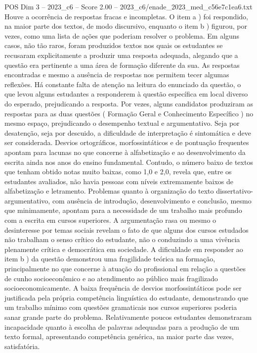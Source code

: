\begin{textsample}{POS Dim 3 – 2023\_c6 – Score 2.00 – 2023\_c6/enade\_2023\_med\_c56e7c1ea6.txt}
Houve a ocorrência de respostas fracas e incompletas.
O item a ) foi respondido, na maior parte dos textos, de modo discursivo, enquanto o item b ) figurou, por vezes, como uma lista de ações que poderiam resolver o problema.
Em alguns casos, não tão raros, foram produzidos textos nos quais os estudantes se recusaram explicitamente a produzir uma resposta adequada, alegando que a questão era pertinente a uma área de formação diferente da sua.
As respostas encontradas e mesmo a ausência de respostas nos permitem tecer algumas reflexões.
Há constante falta de atenção na leitura do enunciado da questão, o que levou alguns estudantes a responderem à questão específica em local diverso do esperado, prejudicando a resposta.
Por vezes, alguns candidatos produziram as respostas para as duas questões ( Formação Geral e Conhecimento Específico ) no mesmo espaço, prejudicando o desempenho textual e argumentativo.
Seja por desatenção, seja por descuido, a dificuldade de interpretação é sintomática e deve ser considerada.
Desvios ortográficos, morfossintáticos e de pontuação frequentes apontam para lacunas no que concerne à alfabetização e ao desenvolvimento da escrita ainda nos anos do ensino fundamental.
Contudo, o número baixo de textos que tenham obtido notas muito baixas, como 1,0 e 2,0, revela que, entre os estudantes avaliados, não havia pessoas com níveis extremamente baixos de alfabetização e letramento.
Problemas quanto à organização do texto dissertativo-argumentativo, com ausência de introdução, desenvolvimento e conclusão, mesmo que minimamente, apontam para a necessidade de um trabalho mais profundo com a escrita em cursos superiores.
A argumentação rasa ou mesmo o desinteresse por temas sociais revelam o fato de que alguns dos cursos estudados não trabalham o senso crítico do estudante, não o conduzindo a uma vivência plenamente crítica e democrática em sociedade.
A dificuldade em responder ao item b ) da questão demonstrou uma fragilidade teórica na formação, principalmente no que concerne à atuação do profissional em relação a questões de cunho socioeconômico e ao atendimento ao público mais fragilizado socioeconomicamente.
A baixa frequência de desvios morfossintáticos pode ser justificada pela própria competência linguística do estudante, demonstrando que um trabalho mínimo com questões gramaticais nos cursos superiores poderia sanar grande parte do problema.
Relativamente poucos estudantes demonstraram incapacidade quanto à escolha de palavras adequadas para a produção de um texto formal, apresentando competência genérica, na maior parte das vezes, satisfatória.

\end{textsample}
